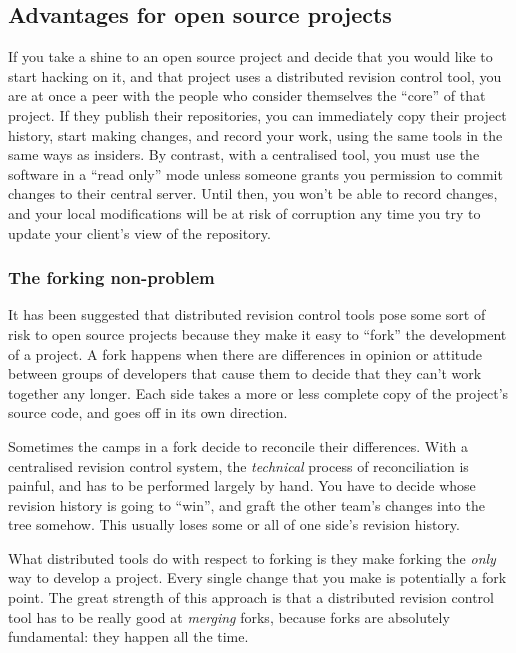 \subsection{Advantages for open source projects}

If you take a shine to an open source project and decide that you
would like to start hacking on it, and that project uses a distributed
revision control tool, you are at once a peer with the people who
consider themselves the ``core'' of that project.  If they publish
their repositories, you can immediately copy their project history,
start making changes, and record your work, using the same tools in
the same ways as insiders.  By contrast, with a centralised tool, you
must use the software in a ``read only'' mode unless someone grants
you permission to commit changes to their central server.  Until then,
you won't be able to record changes, and your local modifications will
be at risk of corruption any time you try to update your client's view
of the repository.

\subsubsection{The forking non-problem}

It has been suggested that distributed revision control tools pose
some sort of risk to open source projects because they make it easy to
``fork'' the development of a project.  A fork happens when there are
differences in opinion or attitude between groups of developers that
cause them to decide that they can't work together any longer.  Each
side takes a more or less complete copy of the project's source code,
and goes off in its own direction.

Sometimes the camps in a fork decide to reconcile their differences.
With a centralised revision control system, the \emph{technical}
process of reconciliation is painful, and has to be performed largely
by hand.  You have to decide whose revision history is going to
``win'', and graft the other team's changes into the tree somehow.
This usually loses some or all of one side's revision history.

What distributed tools do with respect to forking is they make forking
the \emph{only} way to develop a project.  Every single change that
you make is potentially a fork point.  The great strength of this
approach is that a distributed revision control tool has to be really
good at \emph{merging} forks, because forks are absolutely
fundamental: they happen all the time.  

